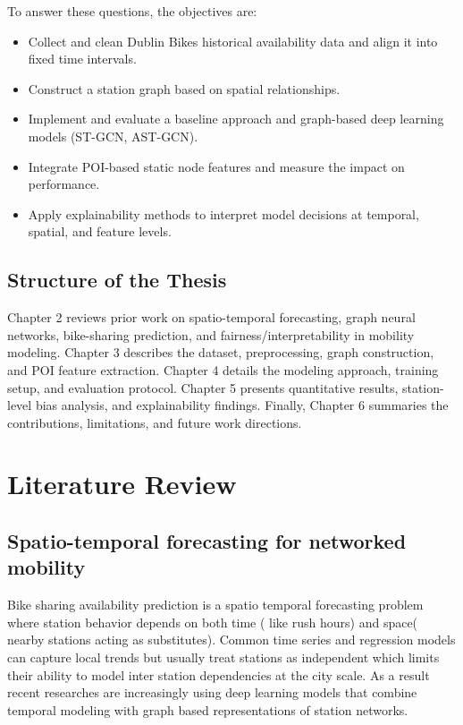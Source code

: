 \documentclass[11pt]{report}
\begin{document}
To answer these questions, the objectives are:
\begin{itemize}
    \item Collect and clean Dublin Bikes historical availability data and align it into fixed time intervals.
    \item Construct a station graph based on spatial relationships.
    \item Implement and evaluate a baseline approach and graph-based deep learning models (ST-GCN, AST-GCN).
    \item Integrate POI-based static node features and measure the impact on performance.
    \item Apply explainability methods to interpret model decisions at temporal, spatial, and feature levels.
\end{itemize}

\section{Structure of the Thesis}
Chapter 2 reviews prior work on spatio-temporal forecasting, graph neural networks, bike-sharing prediction, and fairness/interpretability in mobility modeling. Chapter 3 describes the dataset, preprocessing, graph construction, and POI feature extraction. Chapter 4 details the modeling approach, training setup, and evaluation protocol. Chapter 5 presents quantitative results, station-level bias analysis, and explainability findings. Finally, Chapter 6 summaries the contributions, limitations, and future work directions.

\chapter{Literature Review}
\section{Spatio-temporal forecasting for networked mobility}
Bike sharing availability prediction is a spatio temporal forecasting problem where station behavior depends on both time ( like rush hours) and space( nearby stations acting as substitutes). Common time series and regression models can capture local trends but usually treat stations as independent which limits their ability to model inter station dependencies at the city scale. As a result recent researches are increasingly using deep learning models that combine temporal modeling with graph based representations of station networks.
\end{document}

